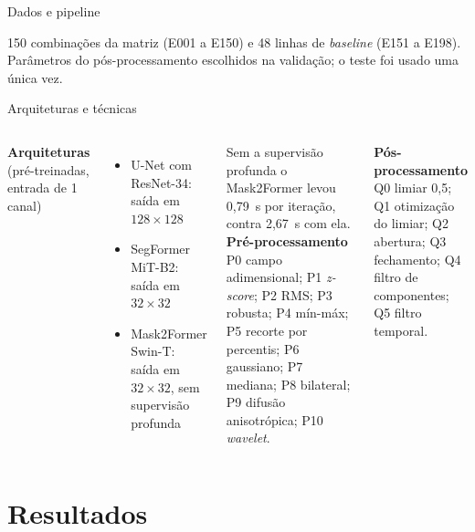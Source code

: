 \documentclass[aspectratio=169,11pt]{beamer}
\newcommand{\leg}[1]{{\small\textcolor{cinza}{#1}}}
\begin{document}
\begin{frame}{Dados e pipeline}
  \vspace{.2em}
  \raggedright\footnotesize
  150 combinações da matriz (E001 a E150) e 48 linhas de \textit{baseline} (E151 a E198).
  Parâmetros do pós-processamento escolhidos na validação; o teste foi usado uma única vez.

\end{frame}

\begin{frame}{Arquiteturas e técnicas}

  \begin{columns}[T,onlytextwidth]
      \textbf{Arquiteturas} \leg{(pré-treinadas, entrada de 1 canal)}
      \begin{itemize}
        \item U-Net com ResNet-34: saída em $128\times128$
        \item SegFormer MiT-B2: saída em $32\times32$
        \item Mask2Former Swin-T: saída em $32\times32$, sem supervisão profunda
      \end{itemize}
      \leg{Sem a supervisão profunda o Mask2Former levou 0,79~s por iteração,
      contra 2,67~s com ela.}
      \textbf{Pré-processamento}\\
      \small P0 campo adimensional; P1 \textit{z-score}; P2 RMS; P3 robusta;
      P4 mín-máx; P5 recorte por percentis; P6 gaussiano; P7 mediana;
      P8 bilateral; P9 difusão anisotrópica; P10 \textit{wavelet}.

      \normalsize\textbf{Pós-processamento}\\
      \small Q0 limiar 0,5; Q1 otimização do limiar; Q2 abertura;
      Q3 fechamento; Q4 filtro de componentes; Q5 filtro temporal.
  \end{columns}

\end{frame}

\section{Resultados}
\end{document}
